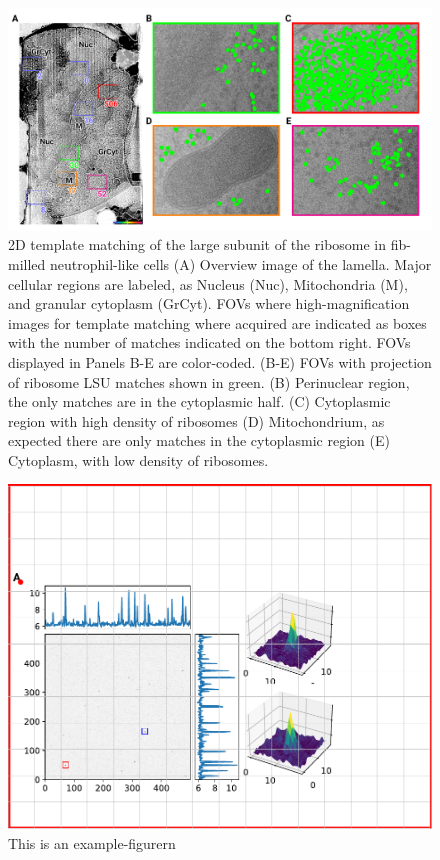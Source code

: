\documentclass[
]{article}
\begin{document}
\begin{figure}
\hypertarget{fig:initmatching}{%
\centering
\includegraphics{figures/initmatching.pdf}
\caption{2D template matching of the large subunit of the ribosome in fib-milled neutrophil-like cells
(A) Overview image of the lamella. Major cellular regions are labeled, as Nucleus (Nuc), Mitochondria (M), and granular cytoplasm (GrCyt). FOVs where high-magnification images for template matching where acquired are indicated as boxes with the number of matches indicated on the bottom right. FOVs displayed in Panels B-E are color-coded.
(B-E) FOVs with projection of ribosome LSU matches shown in green. (B) Perinuclear region, the only matches are in the cytoplasmic half. (C) Cytoplasmic region with high density of ribosomes (D) Mitochondrium, as expected there are only matches in the cytoplasmic region (E) Cytoplasm, with low density of ribosomes.}\label{fig:initmatching}
}
\end{figure}

\begin{figure}
\hypertarget{fig:initmatching2}{%
\centering
\includegraphics{figures/initmatching2.pdf}
\caption{This is an example-figurern}\label{fig:initmatching2}
}
\end{figure}
\end{document}
